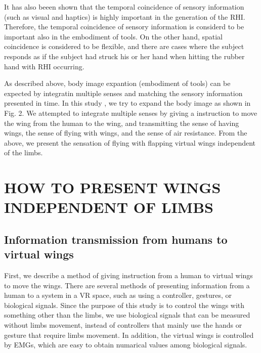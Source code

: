\documentclass[letterpaper, 10 pt, conference]{ieeeconf}  %
\begin{document}
                It has also beeen shown that the temporal coincidence of sensory information (such as visual and haptics) is highly important in the generation of the RHI.  
                Therefore, the temporal coincidence of sensory information is considerd to be important also in the embodiment of tools.  
                On the other hand, spatial coincidence is considered to be flexible, and there are cases where the subject responds as if the subject had struck his or her hand when hitting the rubber hand with RHI occurring.  


                As described above, body image expantion (embodiment of tools) can be expected by integratin multiple senses and matching the sensory information presented in time.  
                In this study , we try to expand the body image as shown in Fig. 2.  
                We attempted to integrate multiple senses by giving a instruction to move the wing from the human to the wing, and transmitting the sense of having wings, the sense of flying with wings, and the sense of air resistance.  
                From the above, we present the sensation of flying with flapping virtual wings independent of the limbs.

\section{HOW TO PRESENT WINGS INDEPENDENT OF LIMBS}
        \subsection{Information transmission from humans to virtual wings}
                First, we describe a method of giving instruction from a human to virtual wings to move the wings.
                There are several methods of presenting information from a human to a system in a VR space, such as using a controller, gestures, or biological signals.
                Since the purpose of this study is to control the wings with something other than the limbs, we use biological signals that can be measured without limbs movement, instead of controllers that mainly use the hands or gesture that require limbs movement.
                In addition, the virtual  wings is controlled by EMGs, which are easy to obtain numarical values among biological signals.
\end{document}
